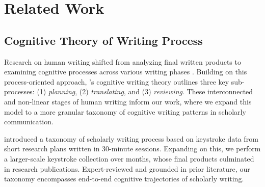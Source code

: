 

\section{Related Work}

\subsection{Cognitive Theory of Writing Process}

Research on human writing shifted from analyzing final written products to examining cognitive processes across various writing phases \cite{diederich1974measuring, Krapels1990SecondLW, macarthur2016writing}. 
Building on this process-oriented approach, \citet{f508427a-e4c0-3d6a-8abf-03a5d21ec6c4}’s cognitive writing theory outlines three key sub-processes: (1) \textit{planning}, (2) \textit{translating}, and (3) \textit{reviewing}. These interconnected and non-linear stages of human writing inform our work, where we expand this model to a more granular taxonomy of cognitive writing patterns in scholarly communication.

\citet{koo2023decoding} introduced a taxonomy of scholarly writing process based on keystroke data from short research plans written in 30-minute sessions. Expanding on this, we perform a larger-scale keystroke collection over months, whose final products culminated in research publications. Expert-reviewed and grounded in prior literature, our taxonomy encompasses end-to-end cognitive trajectories of scholarly writing.




